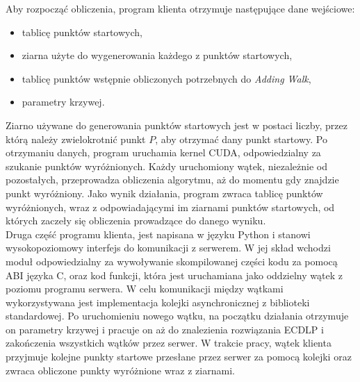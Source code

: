 Aby rozpocząć obliczenia, program klienta otrzymuje następujące dane wejściowe:
\begin{itemize}
    \item tablicę punktów startowych,
    \item ziarna użyte do wygenerowania każdego z punktów startowych,
    \item tablicę punktów wstępnie obliczonych potrzebnych do \textit{Adding Walk},
    \item parametry krzywej.  
\end{itemize}
Ziarno używane do generowania punktów startowych jest w postaci liczby, przez
którą należy zwielokrotnić punkt $P$, aby otrzymać dany punkt startowy.
Po otrzymaniu danych, program uruchamia kernel CUDA, odpowiedzialny za szukanie punktów wyróżnionych.
Każdy uruchomiony wątek, niezależnie od pozostałych, przeprowadza obliczenia algorytmu, aż do momentu
gdy znajdzie punkt wyróżniony.
Jako wynik działania, program zwraca
tablicę punktów wyróżnionych, wraz z odpowiadającymi im ziarnami punktów startowych, od których zaczeły
się obliczenia prowadzące do danego wyniku. \\
Druga część programu klienta, jest napisana w języku Python i stanowi wysokopoziomowy interfejs do komunikacji
z serwerem. W jej skład wchodzi moduł odpowiedzialny za wywoływanie skompilowanej części kodu za pomocą ABI języka C,
oraz kod funkcji, która jest uruchamiana jako oddzielny wątek z poziomu programu serwera. W celu komunikacji
między wątkami wykorzystywana jest implementacja kolejki asynchronicznej z biblioteki standardowej.
Po uruchomieniu nowego wątku, na początku działania otrzymuje on parametry krzywej i pracuje
on aż do znalezienia rozwiązania ECDLP i zakończenia wszystkich wątków przez serwer.
W trakcie pracy, wątek klienta przyjmuje kolejne punkty startowe przesłane przez serwer za pomocą kolejki
oraz zwraca obliczone punkty wyróżnione wraz z ziarnami.

